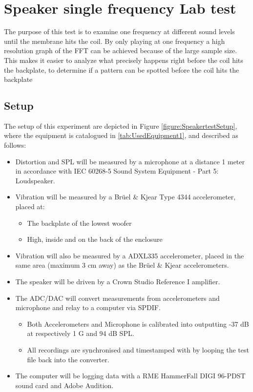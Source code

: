 \chapter{Speaker single frequency Lab test} \label{app:journal_speaker_test}

The purpose of this test is to examine one frequency at different sound levels until the membrane hits the coil. By only playing at one frequency a high resolution graph of the FFT can be achieved because of the large sample size. This makes it easier to analyze what precisely happens right before the coil hits the backplate, to determine if a pattern can be spotted before the coil hits the backplate


\section{Setup}

The setup of this experiment are depicted in Figure \ref{figure:SpeakertestSetup}, where the equipment is catalogued in \autoref{tab:UsedEquipment1}, and described as follows:

\begin{itemize}
\item Distortion and \gls{SPL} will be measured by a microphone at a distance 1 meter in accordance with IEC 60268-5 Sound System Equipment - Part 5: Loudspeaker.
\item Vibration will be measured by a Brüel \& Kjear Type 4344 accelerometer, placed at:
\begin{itemize}
\item The backplate of the lowest woofer
\item High, inside and on the back of the enclosure 
\end{itemize}
\item Vibration will also be measured by a ADXL335 accelerometer, placed in the same area (maximum 3 cm away) as the Brüel \& Kjear accelerometers. 
\item The speaker will be driven by a Crown Studio Reference I amplifier.
\item The ADC/DAC will convert measurements from accelerometers and microphone and relay to a computer via SPDIF.
\begin{itemize}
\item Both Accelerometers and Microphone is calibrated into outputting -37 dB at respectively 1 G and 94 dB \gls{SPL}.
\item All recordings are synchronised and timestamped with by looping the test file back into the converter.
\end{itemize}
\item The computer will be logging data with a RME HammerFall DIGI 96-PDST sound card and Adobe Audition.
\end{itemize}

